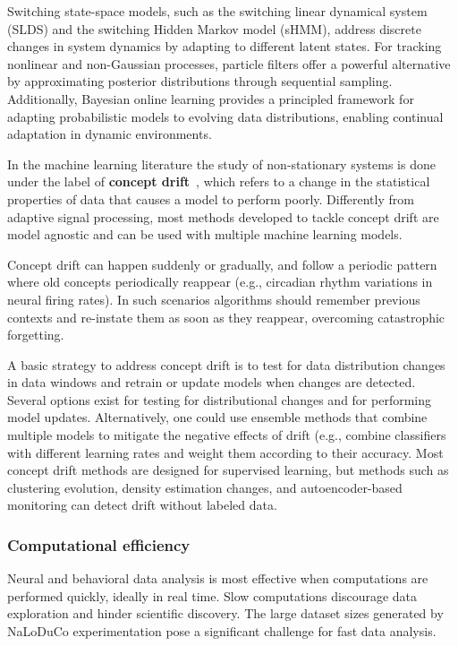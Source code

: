 Switching state-space models, such as the switching linear dynamical system
(SLDS) and the switching Hidden Markov model (sHMM), address discrete changes
in system dynamics by adapting to different latent states. For tracking
nonlinear and non-Gaussian processes, particle filters offer a powerful
alternative by approximating posterior distributions through sequential
sampling. Additionally, Bayesian online learning provides a principled
framework for adapting probabilistic models to evolving data distributions,
enabling continual adaptation in dynamic environments.


In the machine learning literature the study of non-stationary systems is done
under the label of \textbf{concept drift}~\citep{}, which refers to a change in
the statistical properties of data that causes a model to perform poorly.
%
Differently from adaptive signal processing, most methods developed to tackle
concept drift are model agnostic and can be used with multiple machine learning
models.

Concept drift can happen suddenly or gradually, and follow a periodic pattern
where old concepts periodically reappear (e.g., circadian rhythm variations in
neural firing rates). In such scenarios algorithms should remember previous
contexts and re-instate them as soon as they reappear, overcoming catastrophic
forgetting.

A basic strategy to address concept drift is to test for data distribution
changes in data windows and retrain or update models when changes are detected.
Several options exist for testing for distributional changes and for performing
model updates.
%
Alternatively, one could use ensemble methods that combine multiple models to
mitigate the negative effects of drift (e.g., combine classifiers with
different learning rates and weight them according to their accuracy.
%
Most concept drift methods are designed for supervised learning, but methods
such as clustering evolution, density estimation changes, and autoencoder-based
monitoring can detect drift without labeled data.

\subsubsection*{Computational efficiency}

Neural and behavioral data analysis is most effective when computations are
performed quickly, ideally in real time. Slow computations discourage data
exploration and hinder scientific discovery. The large dataset sizes generated by
NaLoDuCo experimentation pose a significant challenge for fast data analysis.

